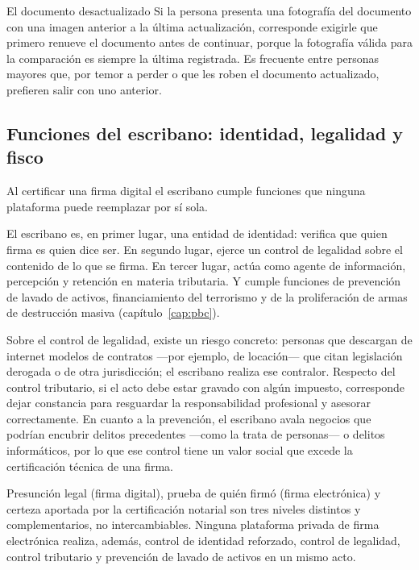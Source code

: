 \documentclass[12pt,oneside]{book}
\begin{document}
\begin{example}{El documento desactualizado}
Si la persona presenta una fotografía del documento con una imagen anterior a la última actualización, corresponde exigirle que primero renueve el documento antes de continuar, porque la fotografía válida para la comparación es siempre la última registrada. Es frecuente entre personas mayores que, por temor a perder o que les roben el documento actualizado, prefieren salir con uno anterior.
\end{example}

\subsection{Funciones del escribano: identidad, legalidad y fisco}

Al certificar una firma digital el escribano cumple funciones que ninguna plataforma puede reemplazar por sí sola.

\begin{important}
El escribano es, en primer lugar, una entidad de identidad: verifica que quien firma es quien dice ser. En segundo lugar, ejerce un control de legalidad sobre el contenido de lo que se firma. En tercer lugar, actúa como agente de información, percepción y retención en materia tributaria. Y cumple funciones de prevención de lavado de activos, financiamiento del terrorismo y de la proliferación de armas de destrucción masiva (capítulo~\ref{cap:pbc}).
\end{important}

Sobre el control de legalidad, existe un riesgo concreto: personas que descargan de internet modelos de contratos ---por ejemplo, de locación--- que citan legislación derogada o de otra jurisdicción; el escribano realiza ese contralor. Respecto del control tributario, si el acto debe estar gravado con algún impuesto, corresponde dejar constancia para resguardar la responsabilidad profesional y asesorar correctamente. En cuanto a la prevención, el escribano avala negocios que podrían encubrir delitos precedentes ---como la trata de personas--- o delitos informáticos, por lo que ese control tiene un valor social que excede la certificación técnica de una firma.

\begin{synthesis}
Presunción legal (firma digital), prueba de quién firmó (firma electrónica) y certeza aportada por la certificación notarial son tres niveles distintos y complementarios, no intercambiables. Ninguna plataforma privada de firma electrónica realiza, además, control de identidad reforzado, control de legalidad, control tributario y prevención de lavado de activos en un mismo acto.
\end{synthesis}
\end{document}
